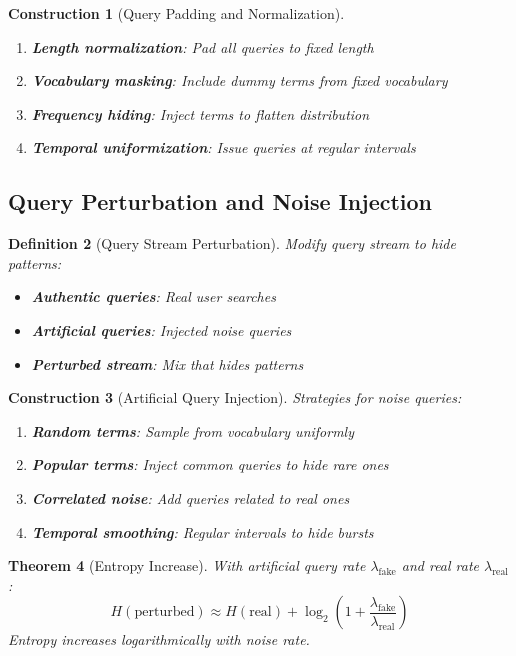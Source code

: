 \documentclass[11pt,final,hidelinks]{article}
\newtheorem{theorem}{Theorem}[section]
\newtheorem{definition}[theorem]{Definition}
\newtheorem{construction}[theorem]{Construction}
\begin{document}
\begin{construction}[Query Padding and Normalization]
\begin{enumerate}
    \item \textbf{Length normalization}: Pad all queries to fixed length
    \item \textbf{Vocabulary masking}: Include dummy terms from fixed vocabulary
    \item \textbf{Frequency hiding}: Inject terms to flatten distribution
    \item \textbf{Temporal uniformization}: Issue queries at regular intervals
\end{enumerate}
\end{construction}

\subsection{Query Perturbation and Noise Injection}

\begin{definition}[Query Stream Perturbation]
Modify query stream to hide patterns:
\begin{itemize}
    \item \textbf{Authentic queries}: Real user searches
    \item \textbf{Artificial queries}: Injected noise queries
    \item \textbf{Perturbed stream}: Mix that hides patterns
\end{itemize}
\end{definition}

\begin{construction}[Artificial Query Injection]
Strategies for noise queries:
\begin{enumerate}
    \item \textbf{Random terms}: Sample from vocabulary uniformly
    \item \textbf{Popular terms}: Inject common queries to hide rare ones
    \item \textbf{Correlated noise}: Add queries related to real ones
    \item \textbf{Temporal smoothing}: Regular intervals to hide bursts
\end{enumerate}
\end{construction}

\begin{theorem}[Entropy Increase]
With artificial query rate $\lambda_{\text{fake}}$ and real rate $\lambda_{\text{real}}$:
\begin{equation}
H(\text{perturbed}) \approx H(\text{real}) + \log_2\left(1 + \frac{\lambda_{\text{fake}}}{\lambda_{\text{real}}}\right)
\end{equation}
Entropy increases logarithmically with noise rate.
\end{theorem}
\end{document}
